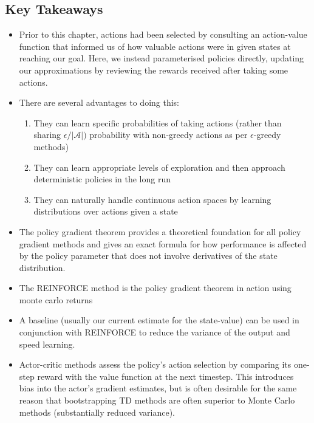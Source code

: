 \subsection{Key Takeaways}
\begin{itemize}
\item Prior to this chapter, actions had been selected by consulting an action-value function that informed us of how valuable actions were in given states at reaching our goal. Here, we instead parameterised policies directly, updating our approximations by reviewing the rewards received after taking some actions.
\item There are several advantages to doing this:
\begin{enumerate}
\item They can learn specific probabilities of taking actions (rather than sharing $\epsilon / |\mathcal{A}|)$ probability with non-greedy actions as per $\epsilon$-greedy methods)
\item They can learn appropriate levels of exploration and then approach deterministic policies in the long run
\item They can naturally handle continuous action spaces by learning distributions over actions given a state
\end{enumerate}
\item The policy gradient theorem provides a theoretical foundation for all policy gradient methods and gives an exact formula for how performance is affected by the policy parameter that does not involve derivatives of the state distribution.
\item The REINFORCE method is the policy gradient theorem in action using monte carlo returns
\item A baseline (usually our current estimate for the state-value) can be used in conjunction with REINFORCE to reduce the variance of the output and speed learning.
\item Actor-critic methods assess the policy's action selection by comparing its one-step reward with the value function at the next timestep. This introduces bias into the actor's gradient estimates, but is often desirable for the same reason that bootstrapping TD methods are often superior to Monte Carlo methods (substantially reduced variance).

\end{itemize}



